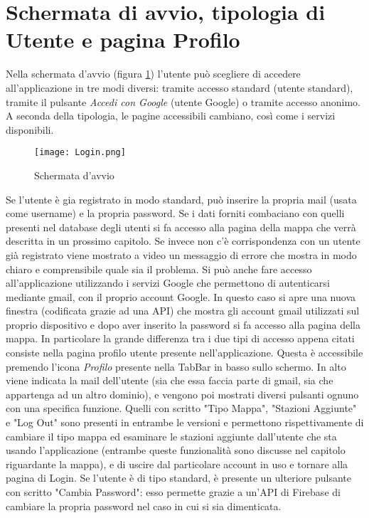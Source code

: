 \section{Schermata di avvio, tipologia di Utente e pagina Profilo}
Nella schermata d'avvio (figura \ref{login}) l'utente può scegliere di accedere
all'applicazione in tre modi diversi: tramite accesso standard (utente
standard), tramite il pulsante \textit{Accedi con Google} (utente Google) o
tramite accesso anonimo. A seconda della tipologia, le pagine accessibili
cambiano, così come i servizi disponibili.
\begin{figure}[h!]
    \centering
    \texttt{[image: Login.png]}
    \caption{Schermata d'avvio}
    \label{login}
\end{figure}
Se l'utente è gia registrato in modo standard, può inserire la propria mail
(usata come username) e la propria password. Se i dati forniti combaciano con
quelli presenti nel database degli utenti si fa accesso alla pagina della mappa
che verrà descritta in un prossimo capitolo. Se invece non c'è corrispondenza
con un utente già registrato viene mostrato a video un messaggio di errore che
mostra in modo chiaro e comprensibile quale sia il problema. \newline
Si può anche fare accesso all'applicazione utilizzando i servizi Google che
permettono di autenticarsi mediante gmail, con il proprio
account Google. In questo caso si apre una nuova finestra (codificata grazie ad
una API) che mostra gli account gmail utilizzati sul proprio dispositivo e dopo
aver inserito la password si fa accesso alla pagina della mappa. In particolare
la grande differenza tra i due tipi di accesso appena citati consiste nella
pagina profilo utente presente nell'applicazione. Questa è accessibile premendo
l'icona \textit{Profilo} presente nella TabBar in basso sullo schermo. In alto
viene indicata la mail dell'utente (sia che essa faccia parte di gmail, sia che appartenga
ad un altro dominio), e vengono poi mostrati diversi pulsanti ognuno con una
specifica funzione. Quelli con scritto "Tipo Mappa", "Stazioni Aggiunte" e "Log
Out" sono presenti in entrambe le versioni e permettono rispettivamente di
cambiare il tipo mappa ed esaminare le stazioni aggiunte dall'utente che sta
usando l'applicazione (entrambe queste funzionalità sono discusse nel capitolo
riguardante la mappa), e di uscire dal particolare account in uso e tornare alla
pagina di Login. Se l'utente è di tipo standard, è presente un ulteriore
pulsante con scritto "Cambia Password": esso permette grazie a un'API di
Firebase di cambiare la propria password nel caso in cui si sia dimenticata.

